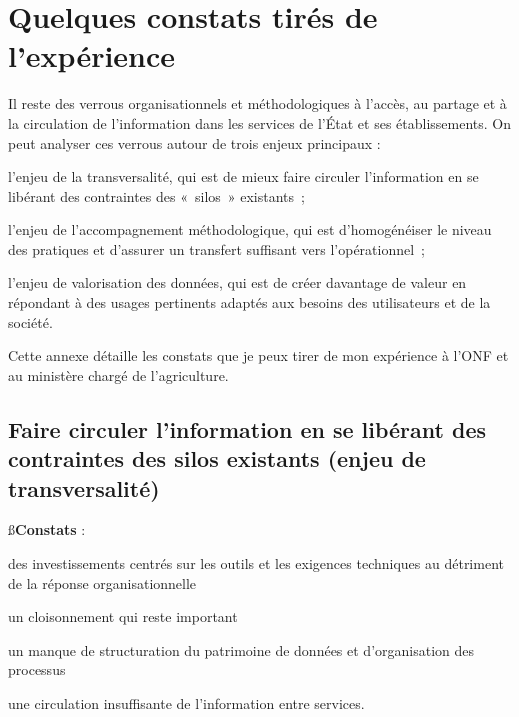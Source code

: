 \section
{Quelques constats tirés de l’expérience}

Il reste des verrous organisationnels et méthodologiques à l’accès, au partage
et à la circulation de l’information dans les services de l’État et ses
établissements. On peut analyser ces verrous autour de trois enjeux principaux :

\startitemize

\item l'enjeu de la transversalité, qui est de mieux faire circuler
      l'information en se libérant des contraintes des « silos » existants ;

\item l'enjeu de l'accompagnement méthodologique, qui est d'homogénéiser
      le niveau des pratiques et d'assurer un transfert suffisant
      vers l'opérationnel ;

\item l'enjeu de valorisation des données, qui est de créer davantage de valeur en
répondant à des usages pertinents adaptés aux besoins des utilisateurs et de
la société.

\stopitemize

Cette annexe détaille les constats que je peux tirer de mon expérience à l'ONF
et au ministère chargé de l'agriculture.

\subsection
{Faire circuler l'information en se libérant des contraintes des silos
existants (enjeu de transversalité)}

{\ss\bf Constats} :

\startitemize

\item des investissements centrés sur les outils et les exigences techniques au
détriment de la réponse organisationnelle

\item un cloisonnement qui reste important

\item un manque de structuration du patrimoine de données et d'organisation des
processus

\item une circulation insuffisante de l'information entre services.

